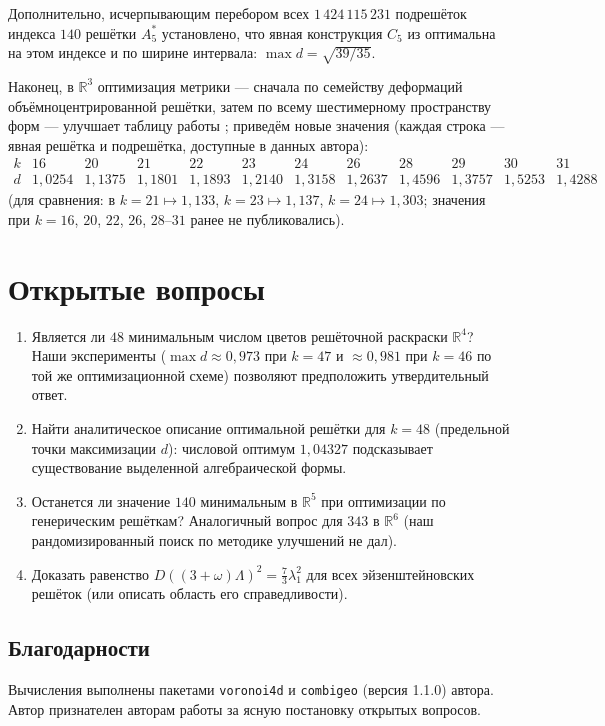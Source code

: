 \documentclass[12pt]{article}
\theoremstyle{definition}
\theoremstyle{remark}
\newcommand{\R}{\mathbb{R}}
\begin{document}
Дополнительно, исчерпывающим перебором всех $1\,424\,115\,231$ подрешёток
индекса $140$ решётки $A_5^*$ установлено, что явная конструкция $C_5$ из
\cite{ABPR} оптимальна на этом индексе и по ширине интервала:
$\max d=\sqrt{39/35}$.

Наконец, в $\R^3$ оптимизация метрики --- сначала по семейству деформаций
объёмноцентрированной решётки, затем по всему шестимерному пространству форм
--- улучшает таблицу работы \cite{Ivanov2011}; приведём новые значения (каждая
строка --- явная решётка и подрешётка, доступные в данных автора):
\[
\begin{array}{c|ccccccccccc}
k & 16 & 20 & 21 & 22 & 23 & 24 & 26 & 28 & 29 & 30 & 31\\
\hline
d & 1{,}0254 & 1{,}1375 & 1{,}1801 & 1{,}1893 & 1{,}2140 & 1{,}3158 &
1{,}2637 & 1{,}4596 & 1{,}3757 & 1{,}5253 & 1{,}4288
\end{array}
\]
(для сравнения: в \cite{Ivanov2011} $k=21\mapsto1{,}133$, $k=23\mapsto1{,}137$,
$k=24\mapsto1{,}303$; значения при $k=16$, $20$, $22$, $26$, $28$--$31$ ранее
не публиковались).

\section{Открытые вопросы}

\begin{enumerate}
\item Является ли $48$ минимальным числом цветов решёточной раскраски $\R^4$?
Наши эксперименты ($\max d\approx0{,}973$ при $k=47$ и $\approx0{,}981$ при
$k=46$ по той же оптимизационной схеме) позволяют предположить утвердительный
ответ.
\item Найти аналитическое описание оптимальной решётки для $k=48$
(предельной точки максимизации $d$): числовой оптимум $1{,}04327$ подсказывает
существование выделенной алгебраической формы.
\item Останется ли значение $140$ минимальным в $\R^5$ при оптимизации по
генерическим решёткам? Аналогичный вопрос для $343$ в $\R^6$ (наш
рандомизированный поиск по методике \cite{ABPR} улучшений не дал).
\item Доказать равенство $D((3+\omega)\Lambda)^2=\tfrac73\lambda_1^2$ для
всех эйзенштейновских решёток (или описать область его справедливости).
\end{enumerate}

\subsection*{Благодарности}
Вычисления выполнены пакетами \texttt{voronoi4d} и \texttt{combigeo} (версия
1.1.0) автора. Автор признателен авторам работы \cite{ABPR} за ясную
постановку открытых вопросов.
\end{document}
